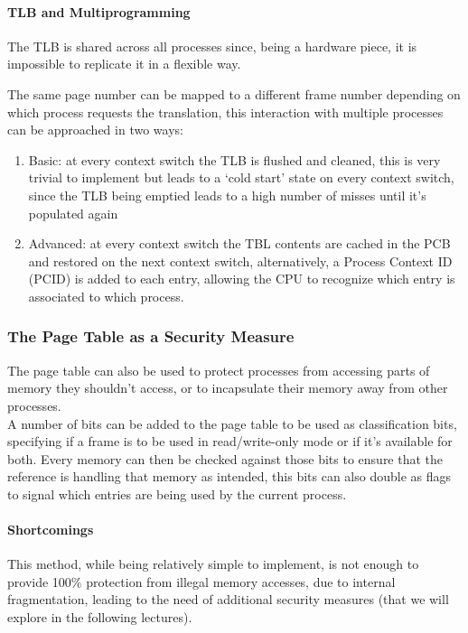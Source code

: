 \documentclass[openright, twoside]{report}
\theoremstyle{definition}
\theoremstyle{example}
\begin{document}
\paragraph{TLB and Multiprogramming}
The TLB is shared across all processes since, being a hardware piece, it is 
impossible to replicate it in a flexible way.

The same page number can be mapped to a different frame number depending on which 
process requests the translation, this interaction with multiple processes can be 
approached in two ways:

\begin{enumerate}
	\item Basic: at every context switch the TLB is flushed and cleaned, this is very 
	trivial to implement but leads to a `cold start' state on every context switch, since 
	the TLB being emptied leads to a high number of misses until it's populated again
	\item Advanced: at every context switch the TBL contents are cached in the PCB and restored 
	on the next context switch, alternatively, a Process Context ID (PCID) is added to each entry,
	allowing the CPU to recognize which entry is associated to which process.
\end{enumerate}

\subsubsection{The Page Table as a Security Measure}
The page table can also be used to protect processes from accessing 
parts of memory they shouldn't access, or to incapsulate their memory away 
from other processes.\\ 

A number of bits can be added to the page table to be used as classification bits, 
specifying if a frame is to be used in read/write-only mode or if it's available for both.
Every memory can then be checked against those bits to ensure that the reference is handling 
that memory as intended, this bits can also double as flags to signal which entries are being used 
by the current process.

\paragraph{Shortcomings}
This method, while being relatively simple to implement, is not enough to provide 100\% protection from 
illegal memory accesses, due to internal fragmentation, leading to the need of additional 
security measures (that we will explore in the following lectures).
\end{document}
